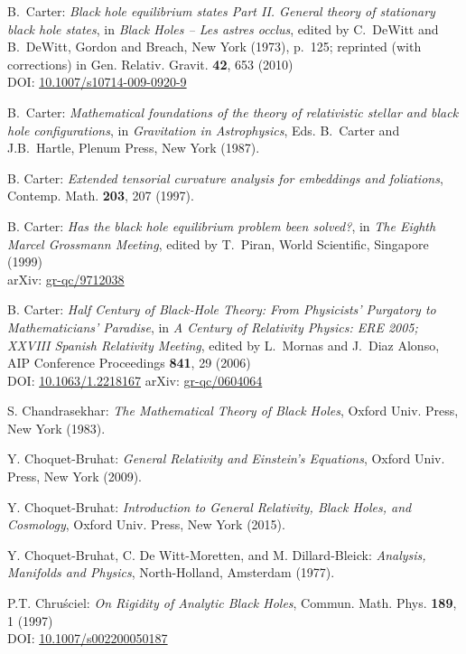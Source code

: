 \begin{thebibliography}{123}
B.~Carter: {\em Black hole equilibrium states Part II. General theory of stationary black hole states}, in {\em Black Holes -- Les astres occlus},  edited by C.~DeWitt and B.~DeWitt,
Gordon and Breach, New York (1973), p.~125; reprinted (with corrections) in
Gen. Relativ. Gravit. {\bf 42}, 653 (2010)\\
DOI: \href{https://doi.org/10.1007/s10714-009-0920-9}{10.1007/s10714-009-0920-9}

B.~Carter: {\em Mathematical foundations of the theory of
relativistic stellar and black hole configurations},
in {\em Gravitation in Astrophysics}, Eds. B.~Carter and J.B.~Hartle,
Plenum Press, New York (1987).

B. Carter: {\em Extended tensorial curvature analysis for embeddings
and foliations},
Contemp. Math. {\bf 203}, 207 (1997).

B. Carter: {\em Has the black hole equilibrium problem been solved?},
in {\em The Eighth Marcel Grossmann Meeting}, edited by T.~Piran,
World Scientific, Singapore (1999)\\
arXiv: \href{https://arxiv.org/abs/gr-qc/9712038}{gr-qc/9712038}

B. Carter:
{\em Half Century of Black‐Hole Theory: From Physicists' Purgatory to Mathematicians' Paradise},
in {\em A Century of Relativity Physics: ERE 2005; XXVIII Spanish Relativity Meeting},
edited by L.~Mornas and J.~Diaz Alonso,
AIP Conference Proceedings {\bf 841}, 29 (2006)\\
DOI: \href{https://doi.org/10.1063/1.2218167}{10.1063/1.2218167}\hfill
arXiv: \href{https://arxiv.org/abs/gr-qc/0604064}{gr-qc/0604064}

S. Chandrasekhar: {\em The Mathematical Theory of Black Holes},
Oxford Univ. Press, New York (1983).

Y. Choquet-Bruhat: {\em General Relativity and Einstein's Equations},
Oxford Univ. Press, New York (2009).

Y. Choquet-Bruhat: {\em Introduction to General Relativity, Black Holes, and
Cosmology}, Oxford Univ. Press, New York (2015).

Y. Choquet-Bruhat, C. De Witt-Moretten, and M. Dillard-Bleick:
{\em Analysis, Manifolds and Physics},
North-Holland, Amsterdam (1977).

P.T. Chru\'sciel: {\em On Rigidity of Analytic Black Holes},
Commun. Math. Phys. {\bf 189}, 1 (1997) \\
DOI: \href{https://doi.org/10.1007/s002200050187}{10.1007/s002200050187}


\end{thebibliography}
